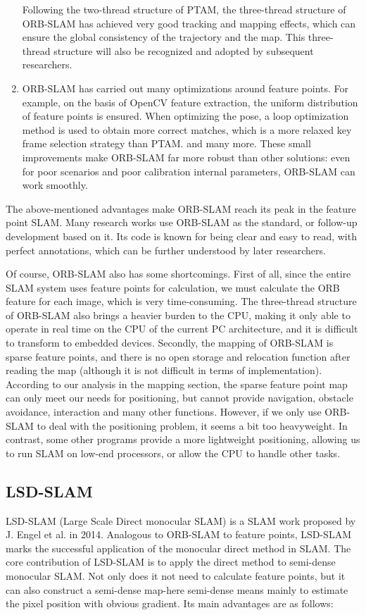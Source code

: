 \begin{enumerate}
	\hspace{2em} Following the two-thread structure of PTAM, the three-thread structure of ORB-SLAM has achieved very good tracking and mapping effects, which can ensure the global consistency of the trajectory and the map. This three-thread structure will also be recognized and adopted by subsequent researchers.
	\item ORB-SLAM has carried out many optimizations around feature points. For example, on the basis of OpenCV feature extraction, the uniform distribution of feature points is ensured. When optimizing the pose, a loop optimization method is used to obtain more correct matches, which is a more relaxed key frame selection strategy than PTAM. and many more. These small improvements make ORB-SLAM far more robust than other solutions: even for poor scenarios and poor calibration internal parameters, ORB-SLAM can work smoothly.
\end{enumerate}

The above-mentioned advantages make ORB-SLAM reach its peak in the feature point SLAM. Many research works use ORB-SLAM as the standard, or follow-up development based on it. Its code is known for being clear and easy to read, with perfect annotations, which can be further understood by later researchers.

Of course, ORB-SLAM also has some shortcomings. First of all, since the entire SLAM system uses feature points for calculation, we must calculate the ORB feature for each image, which is very time-consuming. The three-thread structure of ORB-SLAM also brings a heavier burden to the CPU, making it only able to operate in real time on the CPU of the current PC architecture, and it is difficult to transform to embedded devices. Secondly, the mapping of ORB-SLAM is sparse feature points, and there is no open storage and relocation function after reading the map (although it is not difficult in terms of implementation). According to our analysis in the mapping section, the sparse feature point map can only meet our needs for positioning, but cannot provide navigation, obstacle avoidance, interaction and many other functions. However, if we only use ORB-SLAM to deal with the positioning problem, it seems a bit too heavyweight. In contrast, some other programs provide a more lightweight positioning, allowing us to run SLAM on low-end processors, or allow the CPU to handle other tasks.

\subsection{LSD-SLAM}
LSD-SLAM (Large Scale Direct monocular SLAM) is a SLAM work {\cite{Engel2013, Engel2014}} proposed by J. Engel et al. in 2014. Analogous to ORB-SLAM to feature points, LSD-SLAM marks the successful application of the monocular direct method in SLAM. The core contribution of LSD-SLAM is to apply the direct method to semi-dense monocular SLAM. Not only does it not need to calculate feature points, but it can also construct a semi-dense map-here semi-dense means mainly to estimate the pixel position with obvious gradient. Its main advantages are as follows:

